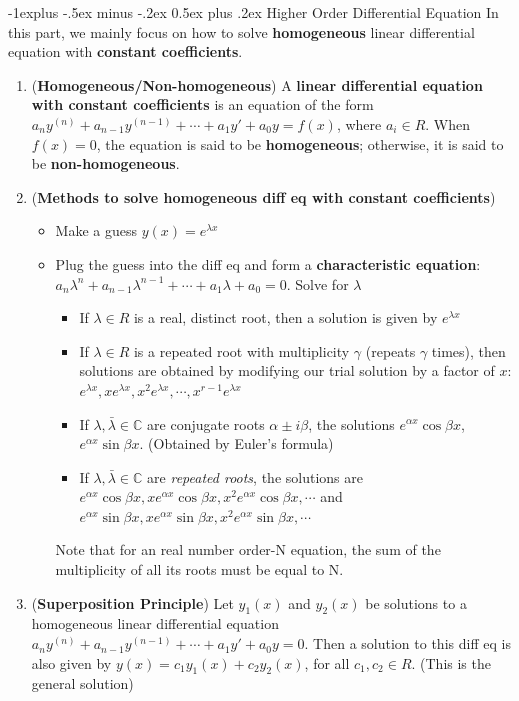 \documentclass[10pt, landscape]{article}
\makeatletter
\renewcommand{\subsection}{\@startsection{subsection}{2}{0mm}%
                                {-1explus -.5ex minus -.2ex}%
                                {0.5ex plus .2ex}%
                                {\normalfont\normalsize\bfseries}}
\makeatother
\begin{document}
\begin{multicols}{4}
\subsection{Higher Order Differential Equation}
In this part, we mainly focus on how to solve \textbf{homogeneous} linear differential equation with \textbf{constant coefficients}.
\begin{enumerate}
    \item (\textbf{Homogeneous/Non-homogeneous}) A \textbf{linear differential equation with constant coefficients} is an equation of the form $a_ny^{(n)}+a_{n-1}y^{(n-1)}+\cdots+a_1y'+a_0y=f(x)$, where $a_i\in R$. When $f(x)=0$, the equation is said to be \textbf{homogeneous}; otherwise, it is said to be \textbf{non-homogeneous}.
    \item (\textbf{Methods to solve homogeneous diff eq with constant coefficients})
    \begin{itemize}
        \item Make a guess $y(x)=e^{\lambda x}$
        \item Plug the guess into the diff eq and form a \textbf{characteristic equation}: $a_n\lambda^n+a_{n-1}\lambda^{n-1}+\cdots+a_1\lambda+a_0=0$. Solve for $\lambda$
        \begin{itemize}
            \item If $\lambda \in R$ is a real, distinct root, then a solution is given by $e^{\lambda x}$
            \item If $\lambda \in R$ is a repeated root with multiplicity $\gamma$ (repeats $\gamma$ times), then solutions are obtained by modifying our trial solution by a factor of $x$: $e^{\lambda x}, xe^{\lambda x}, x^2e^{\lambda x},\cdots, x^{r-1}e^{\lambda x}$
            \item If $\lambda, \bar \lambda \in \mathbb{C}$ are conjugate roots $\alpha \pm i\beta$, the solutions $e^{\alpha x}\cos \beta x$, $e^{\alpha x}\sin \beta x$. (Obtained by Euler's formula)
            \item If $\lambda, \bar \lambda \in \mathbb{C}$ are \textit{repeated roots}, the solutions are $e^{\alpha x}\cos \beta x, xe^{\alpha x}\cos \beta x, x^2e^{\alpha x}\cos \beta x, \cdots$ and $e^{\alpha x}\sin \beta x, xe^{\alpha x}\sin \beta x, x^2e^{\alpha x}\sin \beta x, \cdots$
        \end{itemize}
        Note that for an real number order-N equation, the sum of the multiplicity of all its roots must be equal to N.
    \end{itemize}
    \item (\textbf{Superposition Principle}) Let $y_1(x)$ and $y_2(x)$ be solutions to a homogeneous linear differential equation $a_ny^{(n)}+a_{n-1}y^{(n-1)}+\cdots+a_1y'+a_0y=0$. Then a solution to this diff eq is also given by $y(x)=c_1y_1(x)+c_2y_2(x)$, for all $c_1, c_2 \in R$. (This is the general solution)
\end{enumerate}


\end{multicols}
\end{document}
